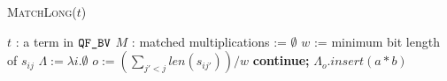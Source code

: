 \begin{algorithm}[t]
 \caption{\textsc{MatchLong}($t$)}
 \label{alg:long}
 \begin{algorithmic}[1]
   \Require $t$ : a term in $\texttt{QF\_BV}$
   \Ensure $M$ : matched multiplications := $\emptyset$
   \State $w$ :=  minimum bit length of $s_{ij}$
   \State $\Lambda := \lambda i. \emptyset$
   \State $o := (\sum_{j' < j} len( s_{ij'}))/w$
    {\bf continue;}
    $\Lambda_o.insert( a * b )$
   \Else~\Return{$\emptyset$}
   \EndIf
   \EndFor
   \State {}
   \EndIf
   \State \Return{$\emptyset$}
 \end{algorithmic}
\end{algorithm}  



